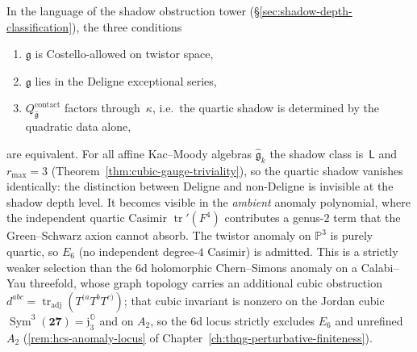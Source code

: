 \begin{remark}
\label{rem:ht-twistor-shadow}
In the language of the shadow obstruction tower
(\S\ref{sec:shadow-depth-classification}), the three
conditions
\begin{enumerate}[label=\textup{(\alph*)}]
\item $\mathfrak{g}$ is Costello-allowed on twistor space,
\item $\mathfrak{g}$ lies in the Deligne exceptional series,
\item $Q^{\mathrm{contact}}_{\widehat{\mathfrak{g}}}$
 factors through~$\kappa$, i.e.\
 the quartic shadow is determined by the quadratic data alone,
\end{enumerate}
are equivalent.
For all affine Kac--Moody algebras
$\widehat{\mathfrak{g}}_k$ the shadow class is~$\mathsf{L}$
and $r_{\max} = 3$
(Theorem~\ref{thm:cubic-gauge-triviality}), so
the quartic shadow vanishes identically: the distinction
between Deligne and non-Deligne is invisible at the shadow
depth level. It becomes visible in the \emph{ambient}
anomaly polynomial, where the independent quartic Casimir
$\operatorname{tr}'(F^4)$ contributes a genus-$2$ term
that the Green--Schwarz axion cannot absorb.
The twistor anomaly on $\mathbb{P}^3$ is purely quartic, so $E_6$
(no independent degree-$4$ Casimir) is admitted. This is a strictly
weaker selection than the $6$d holomorphic Chern--Simons anomaly on a
Calabi--Yau threefold, whose graph topology carries an additional cubic
obstruction $d^{abc} = \operatorname{tr}_{\mathrm{adj}}(T^{(a}T^bT^{c)})$;
that cubic invariant is nonzero on the Jordan cubic
$\operatorname{Sym}^3(\mathbf{27}) = \mathfrak{j}_3^{\mathbb{O}}$ and on
$A_2$, so the $6$d locus strictly excludes $E_6$ and unrefined $A_2$
(\ref{rem:hcs-anomaly-locus} of
Chapter~\ref{ch:thqg-perturbative-finiteness}).
\end{remark}

